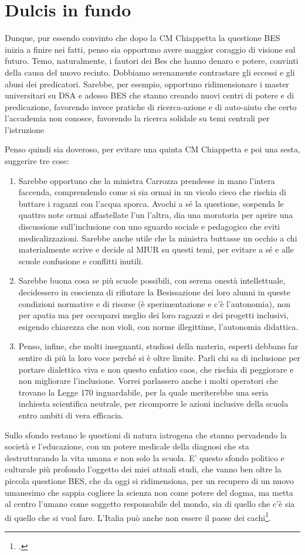 \section*{Dulcis in fundo}
Dunque, pur essendo convinto che dopo la CM Chiappetta la questione BES inizia a finire nei fatti, penso sia opportuno avere maggior coraggio di visione sul futuro.
Temo, naturalmente, i fautori dei Bes che hanno denaro e potere, convinti della causa del nuovo recinto. Dobbiamo serenamente contrastare gli eccessi e gli abusi dei predicatori. Sarebbe, per esempio, opportuno ridimensionare i master universitari su DSA e adesso BES che stanno creando nuovi centri di potere e di predicazione, favorendo invece  pratiche  di ricerca-azione e di auto-aiuto che certo l'accademia  non conosce, favorendo la ricerca solidale su temi centrali per  l'istruzione

Penso quindi sia doveroso, per evitare una quinta CM Chiappetta e poi una sesta, suggerire tre cose:
\begin{enumerate}
	\item Sarebbe opportuno che la ministra Carrozza prendesse in mano l'intera faccenda, comprendendo come si sia ormai in un vicolo cieco che rischia di buttare i ragazzi con l'acqua sporca. Avochi a sé la questione, sospenda le quattro note ormai affastellate l'un l'altra, dia una moratoria per aprire una discussione sull'inclusione con uno sguardo sociale e pedagogico che eviti medicalizzazioni. Sarebbe anche utile che la ministra buttasse un occhio a chi materialmente scrive e decide al MIUR su questi temi,  per evitare a sé  e alle scuole confusione e conflitti inutili.
	\item Sarebbe buona cosa se più scuole possibili, con serena onestà intellettuale, decidessero in coscienza di rifiutare la Besissazione dei loro alunni in queste condizioni normative e di risorse (è sperimentazione e c'è l'autonomia), non per apatia ma per occuparsi meglio dei loro ragazzi e dei progetti inclusivi, esigendo chiarezza che non violi, con norme illegittime, l'autonomia didattica.
	\item Penso, infine, che molti  insegnanti, studiosi della materia, esperti debbano far sentire di più la loro voce perché si è oltre limite. Parli chi sa di inclusione per portare dialettica viva e non questo enfatico caos, che rischia di peggiorare e non migliorare l'inclusione. Vorrei parlassero anche i molti operatori che trovano la Legge 170 inguardabile, per la quale meriterebbe una seria inchiesta scientifica neutrale, per ricomporre le azioni inclusive della scuola entro ambiti di vera efficacia.
\end{enumerate}
Sullo sfondo  restano le questioni di natura iatrogena che stanno pervadendo la società e l'educazione, con un potere medicale della diagnosi che sta destrutturando la vita umana e non solo la scuola. E’ questo sfondo politico e culturale più profondo l'oggetto dei miei attuali studi, che vanno ben oltre la piccola questione BES, che da oggi si ridimensiona, per un recupero di un nuovo umanesimo che sappia cogliere la scienza non come potere del dogma, ma metta al centro l'umano come soggetto responsabile del mondo, sia di quello che c'è sia di quello che si vuol fare. L'Italia può anche non essere il paese dei cachi\footcite{Iosa2013}.